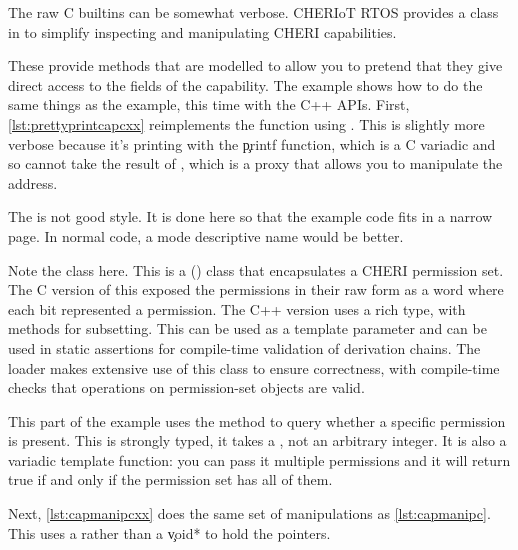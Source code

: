 {{{{{{{{
The raw C builtins can be somewhat verbose.
CHERIoT RTOS provides a  class in  to simplify inspecting and manipulating CHERI capabilities.

These provide methods that are modelled to allow you to pretend that they give direct access to the fields of the capability.
The  example shows how to do the same things as the  example, this time with the C++ APIs.
First, \ref{lst:prettyprintcapcxx} reimplements the  function using .
This is slightly more verbose because it's printing with the \c{printf} function, which is a C variadic and so cannot take the result of , which is a proxy that allows you to manipulate the address.

\codelisting[filename=examples/manipulate_capabilities_cxx/example.cc,marker=print_capability,label=lst:prettyprintcapcxx,caption="Pretty printing a capability using the C++ APIs."]{}

\begin{note}
The  is not good style.
It is done here so that the example code fits in a narrow page.
In normal code, a mode descriptive name would be better.
\end{note}

Note the  class here.
This is a () class that encapsulates a CHERI permission set.
The C version of this exposed the permissions in their raw form as a word where each bit represented a permission.
The C++ version uses a rich type, with methods for subsetting.
This can be used as a template parameter and can be used in static assertions for compile-time validation of derivation chains.
The loader makes extensive use of this class to ensure correctness, with compile-time checks that operations on permission-set objects are valid.

This part of the example uses the  method to query whether a specific permission is present.
This is strongly typed, it takes a , not an arbitrary integer.
It is also a variadic template function: you can pass it multiple permissions and it will return true if and only if the permission set has all of them.

Next, \ref{lst:capmanipcxx} does the same set of manipulations as \ref{lst:capmanipc}.
This uses a  rather than a \c{void*} to hold the pointers.

}}}}}}}}
